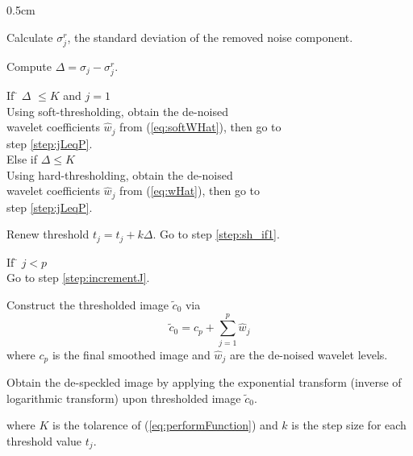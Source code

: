 \documentclass[twocolumn]{article}
\begin{document}
\begin{list}{.}{ 
\setlength{\labelwidth} {0.5cm} \rm }
	\item Calculate $\sigma_{j}^{r}$, the standard deviation of the removed noise component.

	\item Compute $\Delta = \sigma_{j} - \sigma_{j}^{r}$.
	
	\item 
	\begin{tabbing}
	If \= $\Delta$ $\leq K$ and $j = 1$ \\
	\>Using soft-thresholding, obtain the de-noised \\
	\>wavelet coefficients $\hat{w}_{j}$ from (\ref{eq:softWHat}), then go to \\ 
	\>step \ref{step:jLeqP}. \\
	Else if $\Delta \leq K$ \\
	\>Using hard-thresholding, obtain the de-noised \\
	\>wavelet coefficients $\hat{w}_{j}$ from (\ref{eq:wHat}), then go to \\
	\>step \ref{step:jLeqP}. \\
	\end{tabbing}
	\label{step:sh_if2}

	\item Renew threshold $t_{j} = t_{j} + k\Delta$. Go to step \ref{step:sh_if1}.

	\item
	\begin{tabbing}
	If \= $j < p$ \\
	\> Go to step \ref{step:incrementJ}. \\
	\end{tabbing}
	\label{step:jLeqP}

	\item Construct the thresholded image $\tilde{c}_{0}$ via
	\begin{equation}
		\tilde{c}_{0} = c_{p} + \sum_{j=1}^{p} \hat{w}_{j}
	\end{equation}
	where $c_{p}$ is the final smoothed image and
	$\hat{w}_{j}$ are the de-noised wavelet levels.
	
	\item Obtain the de-speckled image by applying the exponential transform (inverse of logarithmic
	transform) upon thresholded image $\tilde{c}_{0}$. 
\end{list}
where $K$ is the tolarence of (\ref{eq:performFunction}) and $k$ is the step size for each threshold 
value $t_{j}$. 
\end{document}
